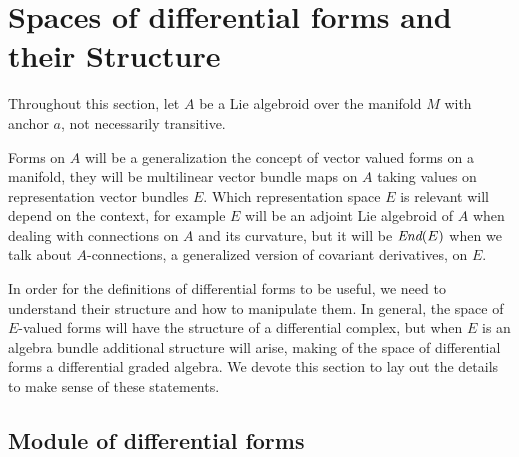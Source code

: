 \section{Spaces of differential forms and their Structure}

Throughout this section, let $A$ be a Lie algebroid over the manifold $M$ with anchor $a$, not necessarily transitive.

Forms on $A$ will be a generalization the concept of vector valued forms on a manifold, they will be multilinear vector bundle maps on $A$ taking values on representation vector bundles $E$. Which representation space $E$ is relevant will depend on the context, for example $E$ will be an adjoint Lie algebroid of $A$ when dealing with connections on $A$ and its curvature, but it will be $\operatorname{\textit{End}}(E)$ when we talk about $A$-connections, a generalized version of covariant derivatives, on $E$.

In order for the definitions of differential forms to be useful, we need to understand their structure and how to manipulate them. In general, the space of $E$-valued forms will have the structure of a differential complex, but when $E$ is an algebra bundle additional structure will arise, making of the space of differential forms a differential graded algebra. We devote this section to lay out the details to make sense of these statements.

\subsection{Module of differential forms}

